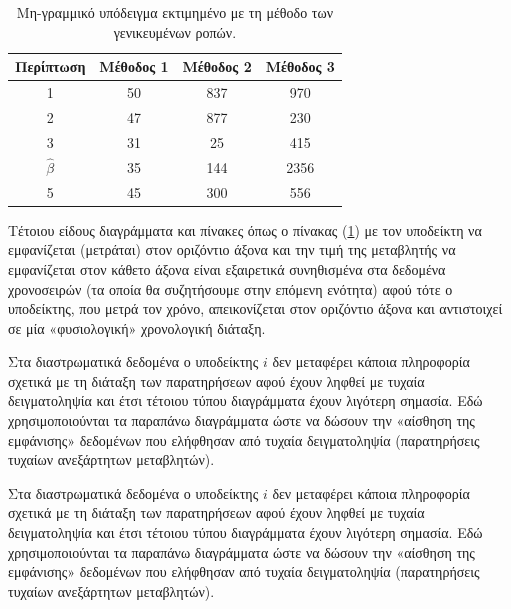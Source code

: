 \documentclass[12pt,a4paper,oneside]{book}
\begin{document}
\begin{table}[!ht]

	\centering %
	\begin{tabular}{c c c c} %
		\hline\hline %
		Περίπτωση & Μέθοδος 1 & Μέθοδος 2 & Μέθοδος 3 \\ [0.75ex]
		\hline %
		1 \vline & 50 & 837 & 970 \\[0.75ex] %
		2 \vline & 47 & 877 & 230 \\[0.75ex]
		3 \vline & 31 & 25 & 415 \\[0.75ex]
		$\hat{\beta}$ \vline & 35 & 144 & 2356 \\[0.75ex]
		5 \vline & 45 & 300 & 556 \\ [1ex] %
		\hline %
	\end{tabular}
	\caption{Μη-γραμμικό υπόδειγμα εκτιμημένο με τη μέθοδο των γενικευμένων ροπών.} %
	\label{tab1} %
\end{table}

Τέτοιου είδους διαγράμματα και πίνακες όπως ο πίνακας (\ref{tab1}) με τον υποδείκτη να εμφανίζεται (μετράται) στον οριζόντιο άξονα και την τιμή της μεταβλητής να εμφανίζεται στον κάθετο άξονα είναι εξαιρετικά συνηθισμένα στα δεδομένα χρονοσειρών (τα οποία θα συζητήσουμε στην επόμενη ενότητα) αφού τότε ο υποδείκτης, που μετρά τον χρόνο, απεικονίζεται στον οριζόντιο άξονα και αντιστοιχεί σε μία «φυσιολογική» χρονολογική διάταξη.

Στα διαστρωματικά δεδομένα ο υποδείκτης $i$ δεν μεταφέρει κάποια πληροφορία σχετικά με τη διάταξη των παρατηρήσεων αφού έχουν ληφθεί με τυχαία δειγματοληψία και έτσι τέτοιου τύπου διαγράμματα έχουν λιγότερη σημασία. Εδώ χρησιμοποιούνται τα παραπάνω διαγράμματα ώστε να δώσουν την «αίσθηση της εμφάνισης» δεδομένων που ελήφθησαν από τυχαία δειγματοληψία (παρατηρήσεις τυχαίων ανεξάρτητων μεταβλητών).

Στα διαστρωματικά δεδομένα ο υποδείκτης $i$ δεν μεταφέρει κάποια πληροφορία σχετικά με τη διάταξη των παρατηρήσεων αφού έχουν ληφθεί με τυχαία δειγματοληψία και έτσι τέτοιου τύπου διαγράμματα έχουν λιγότερη σημασία. Εδώ χρησιμοποιούνται τα παραπάνω διαγράμματα ώστε να δώσουν την «αίσθηση της εμφάνισης» δεδομένων που ελήφθησαν από τυχαία δειγματοληψία (παρατηρήσεις τυχαίων ανεξάρτητων μεταβλητών).

\newpage
{}
\end{document}
